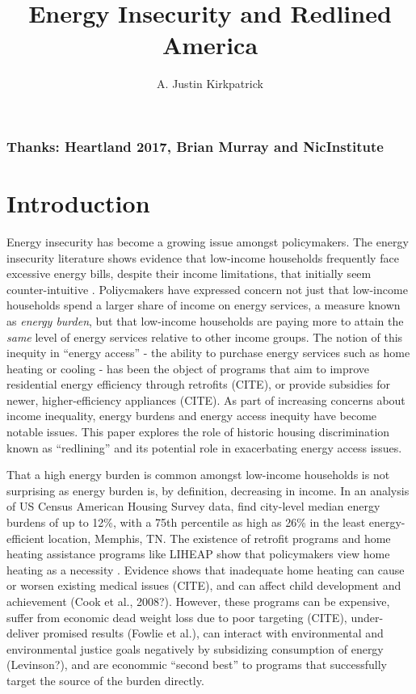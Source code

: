 \documentclass[
]{article}
\title{Energy Insecurity and Redlined America}
\author{A. Justin Kirkpatrick}
\date{}
\begin{document}
\maketitle

\hypertarget{thanks-heartland-2017-brian-murray-and-nicinstitute}{%
\subsubsection{Thanks: Heartland 2017, Brian Murray and NicInstitute}\label{thanks-heartland-2017-brian-murray-and-nicinstitute}}

\hypertarget{introduction}{%
\section{Introduction}\label{introduction}}

Energy insecurity has become a growing issue amongst policymakers. The energy insecurity literature shows evidence that low-income households frequently face
excessive energy bills, despite their income limitations, that initially seem counter-intuitive
\citep{Drehobl2016, Hernandez2013, Hernandez2010}. Poliycmakers have expressed concern not just that low-income
households spend a larger share of income on energy services, a measure known as \emph{energy burden}, but that low-income households are
paying more to attain the \emph{same} level of energy services relative to other income groups. The notion
of this inequity in ``energy access'' - the ability to purchase energy services such as home heating or cooling - has
been the object of programs that aim to improve residential energy efficiency through retrofits (CITE),
or provide subsidies for newer, higher-efficiency appliances (CITE). As part of increasing concerns
about income inequality, energy burdens and energy access inequity have become notable issues. This paper
explores the role of historic housing discrimination known as ``redlining'' and its potential role
in exacerbating energy access issues.

That a high energy burden is common amongst low-income households is not surprising as energy burden is,
by definition, decreasing in income. In an analysis of US Census American Housing Survey data, \citet{Drehobl2016} find city-level median energy burdens
of up to 12\%, with a 75th percentile as high as 26\% in the least energy-efficient location, Memphis, TN.
The existence of retrofit programs and home heating assistance programs like LIHEAP show that policymakers view home heating as a necessity \citep{Stein2018b}. Evidence
shows that inadequate home heating can cause or worsen existing medical issues (CITE), and
can affect child development and achievement (Cook et al., 2008?). However, these programs can be
expensive, suffer from economic dead weight loss due to poor targeting (CITE), under-deliver
promised results (Fowlie et al.), can interact with environmental and environmental justice goals negatively by subsidizing consumption
of energy (Levinson?), and are econommic ``second best'' to programs that successfully target the
source of the burden directly.
\end{document}
